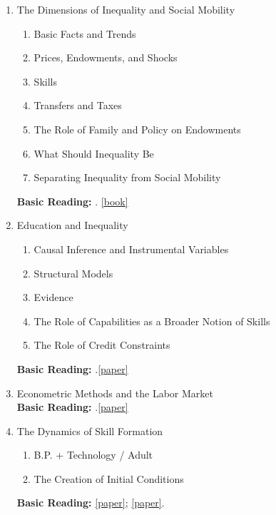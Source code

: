 \documentclass[12pt]{article}
\begin{document}
\begin{enumerate}
\item The Dimensions of Inequality and Social Mobility
\begin{enumerate}
\item Basic Facts and Trends
\item Prices, Endowments, and Shocks
\item Skills
\item Transfers and Taxes
\item The Role of Family and Policy on Endowments
\item What Should Inequality Be
\item Separating Inequality from Social Mobility
\end{enumerate}
\textbf{Basic Reading:} \citet{oecd2011divided}. \href{http://www.oecd-ilibrary.org.proxy.uchicago.edu/social-issues-migration-health/the-causes-of-growing-inequalities-in-oecd-countries_9789264119536-en}{[book]}
\item Education and Inequality
\begin{enumerate}
\item Causal Inference and Instrumental Variables
\item Structural Models
\item Evidence
\item The Role of Capabilities as a Broader Notion of Skills
\item The Role of Credit Constraints
\end{enumerate}
\textbf{Basic Reading:} \citet{heckman2006earnings}.\href{http://ac.els-cdn.com/S1574069206010075/1-s2.0-S1574069206010075-main.pdf?_tid=933794d0-71b0-11e3-aa29-00000aacb35f&acdnat=1388449075_10ef0d45d8d0cf4af1dcb457126446ef}{[paper]}
\item Econometric Methods and the Labor Market\\
\textbf{Basic Reading:} \citet{french2011identification}.\href{http://ac.els-cdn.com/S0169721811004126/1-s2.0-S0169721811004126-main.pdf?_tid=5c1fc58a-71b0-11e3-abd1-00000aacb35d&acdnat=1388448982_31987ea801c83e7a679f998764956494}{[paper]}
\item The Dynamics of Skill Formation
\begin{enumerate}
\item B.P. + Technology / Adult
\item The Creation of Initial Conditions
\end{enumerate}
\textbf{Basic Reading:} \citet{mosso2014} \href{http://www.sv.uio.no/econ/english/research/news-and-events/events/guest-lectures-seminars/Thursday-seminar/2013/papers/heckman-the-economics-of-human-development.pdf}{[paper]}; \citet{rubinstein2006post} \href{http://ac.els-cdn.com/S1574069206010014/1-s2.0-S1574069206010014-main.pdf?_tid=14c8b0d4-71b0-11e3-835f-00000aacb361&acdnat=1388448862_61742534f589f0adf0c69e5ada20db05}{[paper]}.

\end{enumerate}
\end{document}
